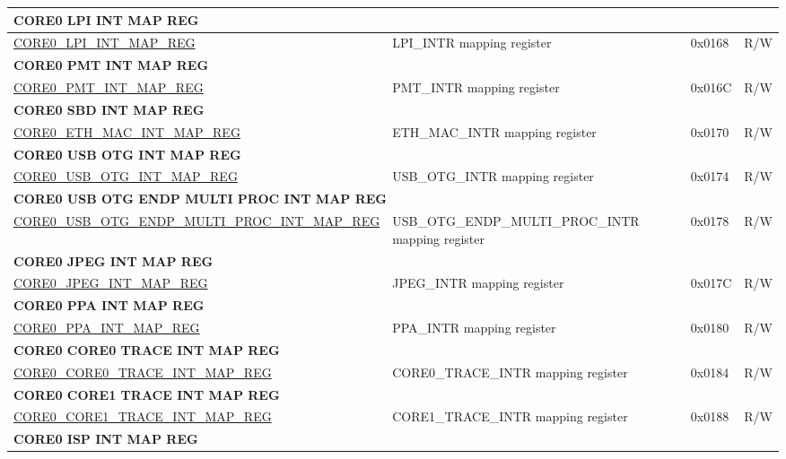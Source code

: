 \begin{longtable}{ | p{7.5cm} | p{7.2cm} | p{1.3cm} | p{1cm} | }
\multicolumn{4}{|l|}{\textbf{CORE0 LPI INT MAP REG}} \\ \hline
\hyperref[regdesc:CORE0LPIINTMAPREG]{CORE0\_LPI\_INT\_MAP\_REG} & LPI\_INTR mapping register & 0x0168 & R/W \\ \hline
\multicolumn{4}{|l|}{\textbf{CORE0 PMT INT MAP REG}} \\ \hline
\hyperref[regdesc:CORE0PMTINTMAPREG]{CORE0\_PMT\_INT\_MAP\_REG} & PMT\_INTR mapping register & 0x016C & R/W \\ \hline
\multicolumn{4}{|l|}{\textbf{CORE0 SBD INT MAP REG}} \\ \hline
\hyperref[regdesc:CORE0SBDINTMAPREG]{CORE0\_ETH\_MAC\_INT\_MAP\_REG} & ETH\_MAC\_INTR mapping register & 0x0170 & R/W \\ \hline
\multicolumn{4}{|l|}{\textbf{CORE0 USB OTG INT MAP REG}} \\ \hline
\hyperref[regdesc:CORE0USBOTGINTMAPREG]{CORE0\_USB\_OTG\_INT\_MAP\_REG} & USB\_OTG\_INTR mapping register & 0x0174 & R/W \\ \hline
\multicolumn{4}{|l|}{\textbf{CORE0 USB OTG ENDP MULTI PROC INT MAP REG}} \\ \hline
\hyperref[regdesc:CORE0USBOTGENDPMULTIPROCINTMAPREG]{CORE0\_USB\_OTG\_ENDP\_MULTI\_PROC\_INT\_MAP\_REG} & USB\_OTG\_ENDP\_MULTI\_PROC\_INTR mapping register & 0x0178 & R/W \\ \hline
\multicolumn{4}{|l|}{\textbf{CORE0 JPEG INT MAP REG}} \\ \hline
\hyperref[regdesc:CORE0JPEGINTMAPREG]{CORE0\_JPEG\_INT\_MAP\_REG} & JPEG\_INTR mapping register & 0x017C & R/W \\ \hline
\multicolumn{4}{|l|}{\textbf{CORE0 PPA INT MAP REG}} \\ \hline
\hyperref[regdesc:CORE0PPAINTMAPREG]{CORE0\_PPA\_INT\_MAP\_REG} & PPA\_INTR mapping register & 0x0180 & R/W \\ \hline
\multicolumn{4}{|l|}{\textbf{CORE0 CORE0 TRACE INT MAP REG}} \\ \hline
\hyperref[regdesc:CORE0CORE0TRACEINTMAPREG]{CORE0\_CORE0\_TRACE\_INT\_MAP\_REG} & CORE0\_TRACE\_INTR mapping register & 0x0184 & R/W \\ \hline
\multicolumn{4}{|l|}{\textbf{CORE0 CORE1 TRACE INT MAP REG}} \\ \hline
\hyperref[regdesc:CORE0CORE1TRACEINTMAPREG]{CORE0\_CORE1\_TRACE\_INT\_MAP\_REG} & CORE1\_TRACE\_INTR mapping register & 0x0188 & R/W \\ \hline
\multicolumn{4}{|l|}{\textbf{CORE0 ISP INT MAP REG}} \\ \hline

\end{longtable}
